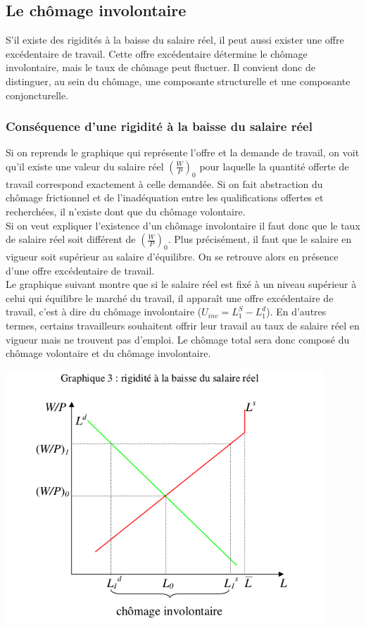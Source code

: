 \documentclass[10pt]{book}
\begin{document}
\subsection{Le chômage involontaire}
S'il existe des rigidités à la baisse du salaire réel, il peut aussi exister une offre excédentaire de travail. Cette offre excédentaire détermine le chômage involontaire, mais le taux de chômage peut fluctuer. Il convient donc de distinguer, au sein du chômage, une composante structurelle et une composante conjoncturelle.
\subsubsection{Conséquence d'une rigidité à la baisse du salaire réel}
Si on reprends le graphique qui représente l'offre et la demande de travail, on voit qu'il existe une valeur du salaire réel $(\frac{W}{P})_0$ pour laquelle la quantité offerte de travail correspond exactement à celle demandée. Si on fait abstraction du chômage frictionnel et de l'inadéquation entre les qualifications offertes et recherchées, il n'existe dont que du chômage volontaire. \\
Si on veut expliquer l'existence d'un chômage involontaire il faut donc que le taux de salaire réel soit différent de $(\frac{W}{P})_0$. Plus précisément, il faut que le salaire en vigueur soit supérieur au salaire d'équilibre. On se retrouve alors en présence d'une offre excédentaire de travail. \\
Le graphique suivant montre que si le salaire réel est fixé à un niveau supérieur à celui qui équilibre le marché du travail, il apparaît une offre excédentaire de travail, c'est à dire du chômage involontaire ($U_{inv} = L_1^S - L_1^d$). En d'autres termes, certains travailleurs souhaitent offrir leur travail au taux de salaire réel en vigueur mais ne trouvent pas d'emploi. Le chômage total sera donc composé du chômage volontaire et du chômage involontaire.
\begin{center}
  \includegraphics[width=12cm]{graph44.png}
\end{center}
\end{document}
